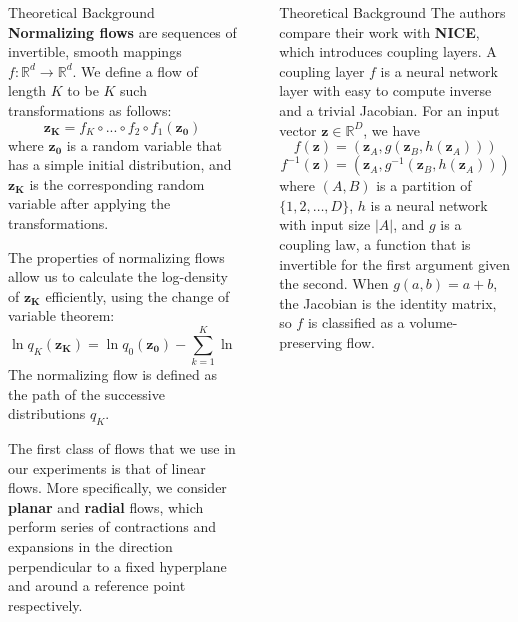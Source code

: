 \documentclass[final,hyperref={pdfpagelabels=false}]{beamer}
\newcommand{\shrink}{-15pt}
\begin{document}
\begin{frame}[t]
\begin{columns}[t]
\begin{column}{.3\textwidth}
    \begin{block}{Theoretical Background}
    \textbf{Normalizing flows} are sequences of invertible, smooth mappings $f:\mathbb{R}^d\rightarrow \mathbb{R}^d$. We define a flow of length $K$ to be $K$ such transformations as follows:
    \[ \mathbf{z_K} = f_K \circ ... \circ f_2 \circ f_1 (\mathbf{z_0}) \] 
    where $\mathbf{z_0}$ is a random variable that has a simple initial distribution, and $\mathbf{z_K}$ is the corresponding random variable after applying the transformations.
    
    The properties of normalizing flows allow us to calculate the log-density of $\mathbf{z_K}$ efficiently, using the change of variable theorem:
    \[ \ln q_K(\mathbf{z_K}) = \ln q_0(\mathbf{z_0}) - \sum_{k=1}^{K} \ln \left| \det \frac{\partial f_k}{\partial \mathbf{z_{k-1}}} \right| \]
    The normalizing flow is defined as the path of the successive distributions $q_K$.
    
    The first class of flows that we use in our experiments is that of linear flows. More specifically, we consider \textbf{planar} and \textbf{radial} flows, which perform series of contractions and expansions in the direction perpendicular to a fixed hyperplane and around a reference point respectively.
          
    \end{block}
  \end{column} %


  \begin{column}{.02\textwidth}\end{column} %

  \begin{column}{.3\textwidth} %
    \vspace{\shrink}
    \begin{block}{Theoretical Background}
      The authors compare their work with \textbf{NICE}, which introduces coupling layers. A coupling layer $f$ is a neural network layer with easy to compute inverse and a trivial Jacobian. For an input vector $\mathbf{z} \in \mathbb{R}^D$, we have
\begin{equation}
f(\mathbf{z}) = (\mathbf{z}_A, g(\mathbf{z}_B,h(\mathbf{z}_A))) 
\end{equation}
\begin{equation}
f^{-1}(\mathbf{z}) = (\mathbf{z}_A, g^{-1}(\mathbf{z}_B,h(\mathbf{z}_A)))
\end{equation}
where $(A,B)$ is a partition of $\{1,2,\dots,D\}$, $h$ is a neural network with input size $|A|$, and $g$ is a coupling law, a function that is invertible for the first argument given the second. When $g(a,b)=a+b$, the Jacobian is the identity matrix, so $f$ is classified as a volume-preserving flow.
\end{block}


\end{column}
\end{columns}
\end{frame}
\end{document}
